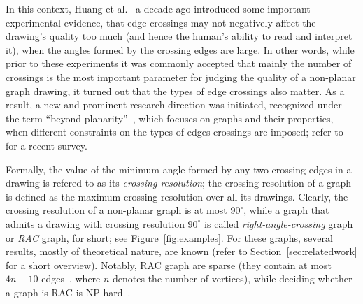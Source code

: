 \documentclass[runningheads]{llncs}
\begin{document}
In this context, Huang et al.~\cite{DBLP:conf/apvis/Huang07,DBLP:journals/vlc/HuangEH14} a decade ago introduced some important experimental evidence,
that edge crossings may not negatively affect the drawing's quality too much (and hence the human's ability to read and interpret it), when the angles formed by the crossing edges are large. In other words, while prior to these experiments it was commonly accepted that mainly the number of crossings is the most important parameter for judging the quality of a non-planar graph drawing, it turned out that the types of edge crossings also matter. As a result, a new and prominent research direction was initiated, recognized under the term ``beyond planarity''~\cite{Shonan2016,Dagstuhl2016,SoCG2017}, which focuses on graphs and their properties, when different constraints on the types of edges crossings are imposed; refer to~\cite{DBLP:journals/corr/abs-1804-07257} for a recent survey. 

Formally, the value of the minimum angle formed by any two crossing edges in a drawing is refered to as its \emph{crossing resolution}; the crossing resolution of a graph is defined as the maximum crossing resolution over all its drawings. Clearly, the crossing resolution of a non-planar graph is at most $90^\circ$, while a graph that admits a drawing with crossing resolution $90^\circ$ is called \emph{right-angle-crossing} graph or \emph{RAC} graph, for short; see Figure~\ref{fig:examples}. For these graphs, several results, mostly of theoretical nature, are known (refer to Section~\ref{sec:relatedwork} for a short overview). Notably, RAC graph are sparse (they contain at most $4n-10$ edges~\cite{DBLP:journals/tcs/DidimoEL11}, where $n$ denotes the number of  vertices), while deciding whether a graph is RAC is NP-hard~\cite{DBLP:journals/jgaa/ArgyriouBS12}.
\end{document}
